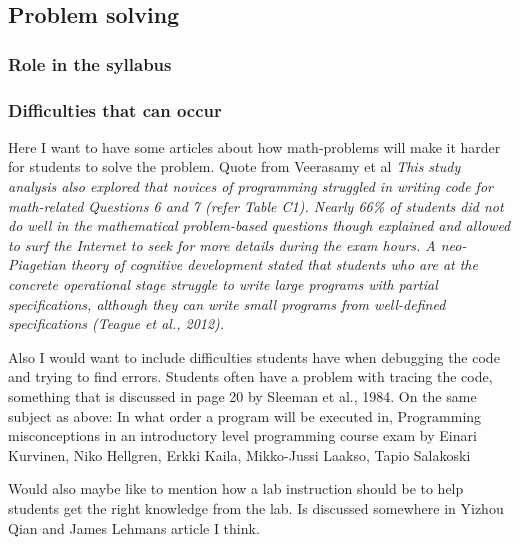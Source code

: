 \subsection{Problem solving}

\subsubsection{Role in the syllabus}

\subsubsection{Difficulties that can occur}


Here I want to have some articles about how math-problems will make it harder for students to solve the problem. Quote from Veerasamy et al \emph{This study analysis also explored that novices of programming struggled in writing code for math-related Questions 6 and 7 (refer Table C1). Nearly 66\% of students did not do well in the mathematical problem-based questions though explained and allowed to surf the Internet to seek for more details during the exam hours. A neo-Piagetian theory of cognitive development stated that students who are at the concrete operational stage struggle to write large programs with partial specifications, although they can write small programs from well-defined specifications (Teague et al., 2012).}

Also I would want to include difficulties students have when debugging the code and trying to find errors. Students often have a problem with tracing the code, something that is discussed in page 20 by Sleeman et al., 1984. 
On the same subject as above: In what order a program will be executed in, Programming misconceptions in an introductory level programming course exam by Einari Kurvinen, Niko Hellgren, Erkki Kaila, Mikko-Jussi Laakso, Tapio Salakoski

Would also maybe like to mention how a lab instruction should be to help students get the right knowledge from the lab. Is discussed somewhere in Yizhou Qian and James Lehmans article I think.

